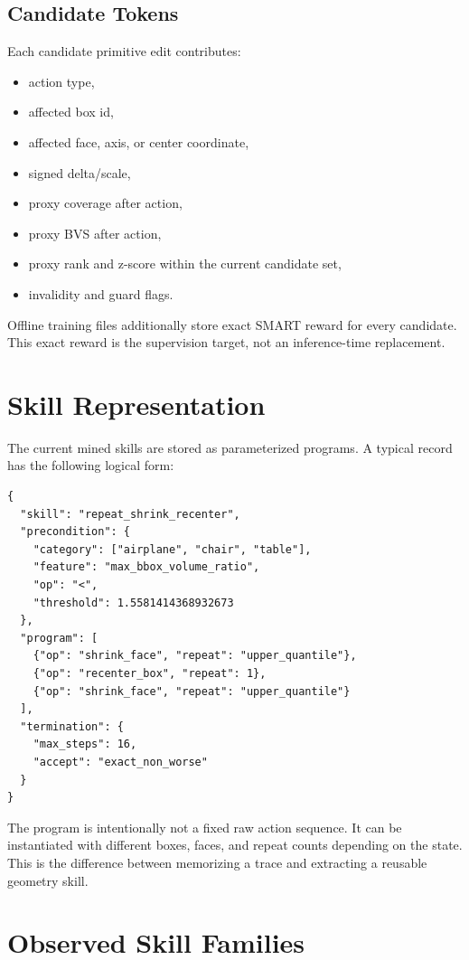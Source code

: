 \documentclass[10pt,twocolumn,letterpaper]{article}
\begin{document}
\subsection{Candidate Tokens}

Each candidate primitive edit contributes:

\begin{itemize}
\item action type,
\item affected box id,
\item affected face, axis, or center coordinate,
\item signed delta/scale,
\item proxy coverage after action,
\item proxy BVS after action,
\item proxy rank and z-score within the current candidate set,
\item invalidity and guard flags.
\end{itemize}

Offline training files additionally store exact SMART reward for every
candidate.  This exact reward is the supervision target, not an inference-time
replacement.

\section{Skill Representation}

The current mined skills are stored as parameterized programs.  A typical
record has the following logical form:

\begin{verbatim}
{
  "skill": "repeat_shrink_recenter",
  "precondition": {
    "category": ["airplane", "chair", "table"],
    "feature": "max_bbox_volume_ratio",
    "op": "<",
    "threshold": 1.5581414368932673
  },
  "program": [
    {"op": "shrink_face", "repeat": "upper_quantile"},
    {"op": "recenter_box", "repeat": 1},
    {"op": "shrink_face", "repeat": "upper_quantile"}
  ],
  "termination": {
    "max_steps": 16,
    "accept": "exact_non_worse"
  }
}
\end{verbatim}

The program is intentionally not a fixed raw action sequence.  It can be
instantiated with different boxes, faces, and repeat counts depending on the
state.  This is the difference between memorizing a trace and extracting a
reusable geometry skill.

\section{Observed Skill Families}
\end{document}
